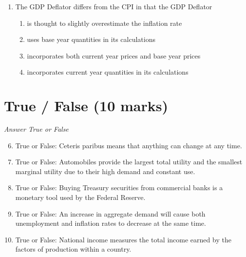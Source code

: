 \documentclass[12pt]{article}
\begin{document}
\begin{enumerate}[label=\arabic*.]
\begin{enumerate}[label=(\alph*)]
    \item the United States to be a net exporter of copper.
    \item the United States to impose a tariff on imported copper to protect domestic producers.
    \item the demand for U.S. copper to fall.
    \item a growing trade deficit in the United States in goods and services.
\end{enumerate}
\item The GDP Deflator differs from the CPI in that the GDP Deflator
\begin{enumerate}[label=(\alph*)]
    \item is thought to slightly overestimate the inflation rate
    \item uses base year quantities in its calculations
    \item incorporates both current year prices and base year prices
    \item incorporates current year quantities in its calculations
\end{enumerate}
\end{enumerate}

\section*{True / False (10 marks)}
\textit{Answer True or False}
\begin{enumerate}[label=\arabic*.]
\setcounter{enumi}{5}
\item True or False: Ceteris paribus means that anything can change at any time.
\item True or False: Automobiles provide the largest total utility and the smallest marginal utility due to their high demand and constant use.
\item True or False: Buying Treasury securities from commercial banks is a monetary tool used by the Federal Reserve.
\item True or False: An increase in aggregate demand will cause both unemployment and inflation rates to decrease at the same time.
\item True or False: National income measures the total income earned by the factors of production within a country.
\end{enumerate}
\end{document}
